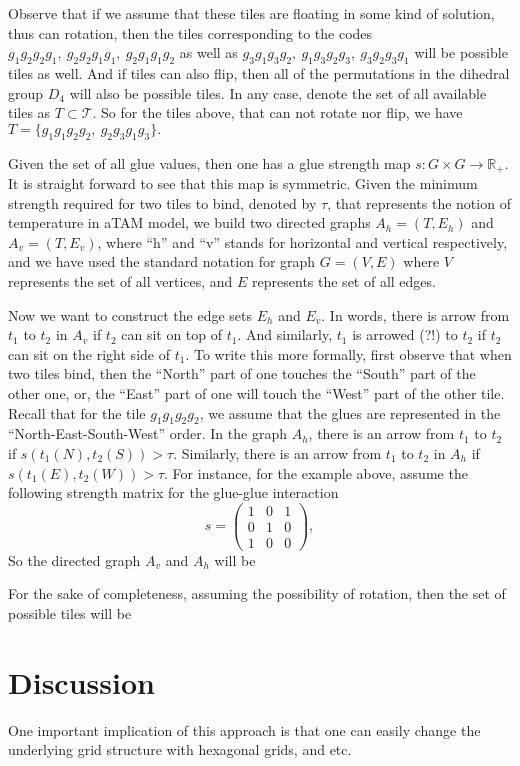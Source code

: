 \documentclass[11pt,a4paper]{article}
\theoremstyle{definition}
\theoremstyle{remark}
\theoremstyle{definition}
\begin{document}
	Observe that if we assume that these tiles are floating in some kind of solution, thus can rotation, then the tiles corresponding to the codes $ g_1g_2g_2g_1,\ g_2g_2g_1g_1,\ g_2g_1g_1g_2 $ as well as $ g_3g_1g_3g_2,\ g_1g_3g_2g_3,\ g_3g_2g_3g_1  $ will be possible tiles as well. And if tiles can also flip, then all of the permutations in the dihedral group $ D_4 $ will also be possible tiles. In any case, denote the set of all available tiles as $ T \subset\mathcal{T} $. So for the tiles above, that can not rotate nor flip, we have $ T=\{g_1g_1g_2g_2,\ g_2g_3g_1g_3\}. $
		
		
	Given the set of all glue values, then one has a glue strength map $ s: G\times G \to \mathbb{R}_{+} $. It is straight forward to see that this map is symmetric. Given the minimum strength required for two tiles to bind, denoted by $ \tau $, that represents the notion of temperature in aTAM model, we build two directed graphs $ A_h = (T, E_h) $ and $ A_v = (T,E_v) $, where ``h'' and ``v'' stands for horizontal and vertical respectively, and we have used the standard notation for graph $ G=(V,E) $ where $ V $ represents the set of all vertices, and $ E $ represents the set of all edges. 
	
	Now we want to construct the edge sets $ E_h $ and $ E_v $. In words, there is arrow from $ t_1 $ to $ t_2 $ in $ A_v $ if $ t_2 $ can sit on top of $ t_1 $. And similarly, $ t_1 $ is arrowed (?!) to $ t_2 $ if $ t_2 $ can sit on the right side of $ t_1 $. To write this more formally, first observe that when two tiles bind, then the ``North'' part of one touches the ``South'' part of the other one, or, the ``East'' part of one will touch  the ``West'' part of the other tile. Recall that for the tile $ g_1g_1g_2g_2 $, we assume that the glues are represented in the ``North-East-South-West'' order. In the graph $ A_h $, there is an arrow from $ t_1 $ to $ t_2 $ if $ s(t_1(N), t_2(S)) > \tau $. Similarly, there is an arrow from $ t_1 $ to $ t_2 $ in $ A_h $ if $ s(t_1(E),t_2(W)) > \tau $. For instance, for the example above, assume the following strength matrix for the glue-glue interaction
	\[ s = \begin{pmatrix}
		1 & 0 & 1 \\
		0 & 1 & 0 \\
		1 & 0 & 0
	\end{pmatrix}, \]
	So the directed graph $ A_v $ and $ A_h $ will be
	
	
	For the sake of completeness, assuming the possibility of rotation, then the set of possible tiles will be
	
	
	
	
	\section{Discussion}
	One important implication of this approach is that one can easily change the underlying grid structure with hexagonal grids, and etc.
	
	
	
\end{document}
